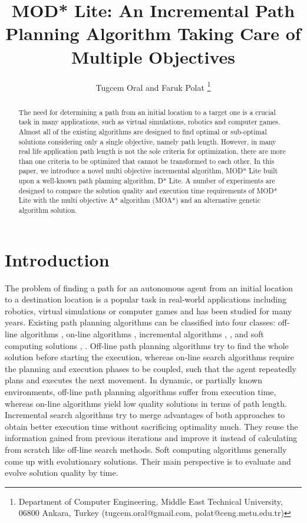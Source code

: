 \documentclass[10pt,journal]{IEEEtran}
\begin{document}
\title{MOD* Lite: An Incremental Path Planning Algorithm Taking Care of Multiple Objectives}

\author{Tugcem Oral and Faruk Polat
\thanks{Department of Computer Engineering, Middle East Technical University, 06800 Ankara, Turkey (tugcem.oral@gmail.com, polat@ceng.metu.edu.tr)}}

\maketitle

\begin{abstract}
The need for determining a path from an initial location to a target one is a crucial task in many applications, such as virtual simulations, robotics and computer games. Almost all of the existing algorithms are designed to find optimal or sub-optimal solutions considering only a single objective, namely path length.  However, in many real life application path length is not the sole criteria for optimization, there are more than one criteria to be optimized that cannot be transformed to each other. In this paper, we introduce  a novel multi objective incremental algorithm, MOD* Lite built upon a well-known path planning algorithm, D* Lite. A number of experiments are designed to compare the solution quality and execution time requirements of MOD* Lite with the multi objective A* algorithm (MOA*) and an alternative genetic algorithm solution.
\end{abstract}

\section{Introduction}
\label{chapter:introduction}

The problem of finding a path for an autonomous agent from an initial location to a destination location is a popular task in real-world applications including robotics, virtual simulations or computer games and has been studied for many years. Existing path planning algorithms can be classified into four classes: off-line algorithms \cite{Dijkstra:1959} \cite{AStarHart:1968}, on-line algorithms \cite{RTAStarKorf:1990}, incremental algorithms \cite{DStar:1994}, \cite{Koenig:2002}, \cite{FocussedDStarStentz:1995} and soft computing solutions \cite{Tarapata:2007}, \cite{Pangilinan}. Off-line path planning algorithms try to find the whole solution before starting the execution, whereas on-line search algorithms require the planning and execution phases to be coupled, such that the agent repeatedly plans and executes the next movement. In dynamic, or partially known environments, off-line path planning algorithms suffer from execution time, whereas on-line algorithms yield low quality solutions in terms of path length. Incremental search algorithms try to merge advantages of both approaches to obtain better execution time without sacrificing optimality much. They reuse the information gained from previous iterations and improve it instead of calculating from scratch like off-line search methods. Soft computing algorithms generally come up with evolutionary solutions. Their main perspective is to evaluate and evolve solution quality by time. 
\end{document}
